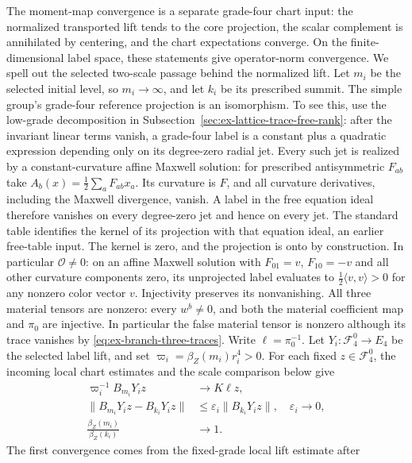 The moment-map convergence is a separate grade-four chart
input: the normalized transported lift tends to the core projection, the
scalar complement is annihilated by centering, and the chart expectations
converge. On the finite-dimensional label space, these statements give
operator-norm convergence. We spell out the selected two-scale passage
behind the normalized lift. Let $m_i$ be the selected initial level,
so $m_i\to\infty$, and let $k_i$ be its prescribed summit. The simple
group's grade-four reference projection is an isomorphism. To see this,
use the low-grade decomposition in Subsection~\ref{sec:ex-lattice-trace-free-rank}:
after the invariant linear terms vanish, a grade-four label is a constant
plus a quadratic expression depending only on its degree-zero radial jet.
Every such jet is realized by a constant-curvature affine Maxwell solution:
for prescribed antisymmetric $F_{ab}$ take
$A_b(x)=\frac12\sum_a F_{ab}x_a$. Its curvature is $F$, and all curvature
derivatives, including the Maxwell divergence, vanish. A label in the free
equation ideal therefore vanishes on every degree-zero jet and hence on every jet. The
standard table identifies the kernel of its projection with that equation
ideal, an earlier free-table input. The kernel is zero, and the projection
is onto by construction. In particular $\mathcal O\ne0$: on an affine
Maxwell solution with $F_{01}=v$, $F_{10}=-v$ and all other curvature
components zero, its unprojected label evaluates to $\tfrac12\langle v,v\rangle>0$
for any nonzero color vector $v$. Injectivity preserves its nonvanishing.
All three material tensors are nonzero: every $w^b\ne0$, and both the
material coefficient map and $\pi_0$ are injective. In particular the
false material tensor is nonzero although its trace vanishes by
\eqref{eq:ex-branch-three-traces}.
Write $\ell=\pi_0^{-1}$. Let
$Y_i:\mathcal F_4^0\to E_4$ be the selected label
lift, and set $\varpi_i=\beta_Z(m_i)r_i^4>0$. For each fixed
$z\in\mathcal F_4^0$, the incoming local chart estimates and the scale
comparison below give
\begin{align}
 \varpi_i^{-1}B_{m_i}Y_i z&\longrightarrow K\ell z,
 \label{eq:ex-branch-lift-initial}\\
 \|B_{m_i}Y_i z-B_{k_i}Y_i z\|
 &\le \varepsilon_i\|B_{k_i}Y_i z\|,\quad
 \varepsilon_i\longrightarrow0,
 \label{eq:ex-branch-lift-stability}\\
 \frac{\beta_Z(m_i)}{\beta_Z(k_i)}&\longrightarrow1.
 \label{eq:ex-branch-lift-beta-ratio}
\end{align}
The first convergence comes from the fixed-grade local lift estimate after
